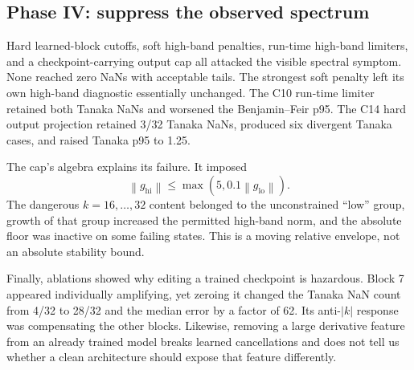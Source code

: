 \documentclass[11pt]{article}
\newcommand{\norm}[1]{\left\lVert #1\right\rVert}
\begin{document}
\subsection{Phase IV: suppress the observed spectrum}

Hard learned-block cutoffs, soft high-band penalties, run-time high-band
limiters, and a checkpoint-carrying output cap all attacked the visible
spectral symptom.  None reached zero NaNs with acceptable tails.  The strongest
soft penalty left its own high-band diagnostic essentially unchanged.  The
C10 run-time limiter retained both Tanaka NaNs and worsened the Benjamin--Feir
p95.  The C14 hard output projection retained 3/32 Tanaka NaNs, produced six
divergent Tanaka cases, and raised Tanaka p95 to 1.25.

The cap's algebra explains its failure.  It imposed
\begin{equation}
 \norm{g_{\mathrm{hi}}}
 \leq \max\!\left(5,0.1\norm{g_{\mathrm{lo}}}\right).
 \label{eq:old-cap}
\end{equation}
The dangerous \(k=16,\ldots,32\) content belonged to the unconstrained
``low'' group, growth of that group increased the permitted high-band norm,
and the absolute floor was inactive on some failing states.  This is a moving
relative envelope, not an absolute stability bound.

Finally, ablations showed why editing a trained checkpoint is hazardous.
Block 7 appeared individually amplifying, yet zeroing it changed the Tanaka NaN
count from 4/32 to 28/32 and the median error by a factor of 62.  Its
anti-\(|k|\) response was compensating the other blocks.  Likewise, removing a
large derivative feature from an already trained model breaks learned
cancellations and does not tell us whether a clean architecture should expose
that feature differently.
\end{document}
